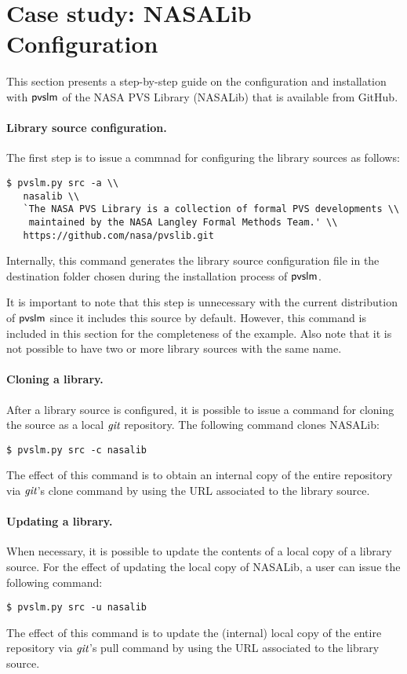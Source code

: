 \section{Case study: NASALib Configuration}
\label{sec.nasalib}

This section presents a step-by-step guide on the configuration and
installation with $\textsf{pvslm}$ of the NASA PVS Library (NASALib) that is
available from GitHub.

\paragraph{Library source configuration.}
The first step is to issue a commnad for configuring the library sources
as follows:
%
\begin{verbatim}
$ pvslm.py src -a \\
   nasalib \\
   `The NASA PVS Library is a collection of formal PVS developments \\
    maintained by the NASA Langley Formal Methods Team.' \\
   https://github.com/nasa/pvslib.git
\end{verbatim}
%
Internally, this command generates the library source
configuration file in the destination folder chosen during the
installation process of $\textsf{pvslm}$.

It is important to note that this step is unnecessary with the current
distribution of $\textsf{pvslm}$ since it includes this source by default.
However, this command is included in this section for the completeness
of the example. Also note that it is not possible to have two or more
library sources with the same name.

\paragraph{Cloning a library.} After a library source
is configured, it is possible to issue a command for cloning the
source as a local $\textit{git}$ repository. The following command clones
NASALib:
%
\begin{verbatim}
$ pvslm.py src -c nasalib
\end{verbatim}
%
The effect of this command is to obtain an internal copy of the entire
repository via $\textit{git}$'s clone command by using the URL associated to
the library source.

\paragraph{Updating a library.} When necessary, it is possible to update
the contents of a local copy of a library source. For the effect of
updating the local copy of NASALib, a user can issue the following
command:
%
\begin{verbatim}
$ pvslm.py src -u nasalib
\end{verbatim}
%
The effect of this command is to update the (internal) local copy of
the entire repository via $\textit{git}$'s pull command by using the URL
associated to the library source.

